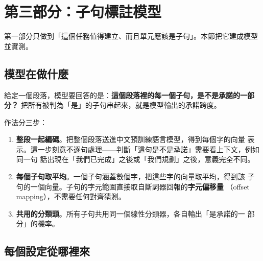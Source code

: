 \documentclass[11pt,a4paper]{ctexart}
\begin{document}
\section{第三部分：子句標註模型}
\label{sec:tagger}

第一部分只做到「這個任務值得建立、而且單元應該是子句」。本節把它建成模型並實測。

\subsection{模型在做什麼}

給定一個段落，模型要回答的是：\textbf{這個段落裡的每一個子句，是不是承諾的一部分？}
把所有被判為「是」的子句串起來，就是模型輸出的承諾跨度。

作法分三步：

\begin{enumerate}[leftmargin=2em, itemsep=3pt]
  \item \textbf{整段一起編碼}。把整個段落送進中文預訓練語言模型，得到每個字的向量
        表示。這一步刻意不逐句處理——判斷「這句是不是承諾」需要看上下文，例如同一句
        話出現在「我們已完成」之後或「我們規劃」之後，意義完全不同。
  \item \textbf{每個子句取平均}。一個子句涵蓋數個字，把這些字的向量取平均，得到該
        子句的一個向量。子句的字元範圍直接取自斷詞器回報的\textbf{字元偏移量}
        （offset mapping），不需要任何對齊猜測。
  \item \textbf{共用的分類頭}。所有子句共用同一個線性分類器，各自輸出「是承諾的一
        部分」的機率。
\end{enumerate}

\subsection{每個設定從哪裡來}
\end{document}
